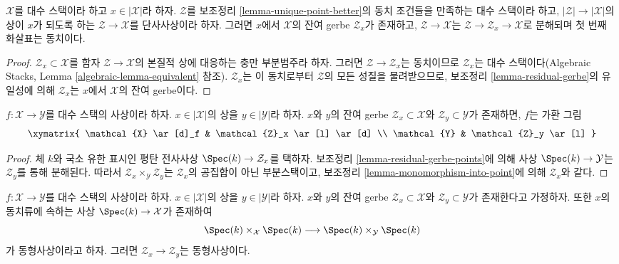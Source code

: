 \begin{lemma}
\label{lemma-residual-gerbe-unique}
$\mathcal{X}$를 대수 스택이라 하고 $x \in |\mathcal{X}|$라 하자.
$\mathcal{Z}$를 보조정리 \ref{lemma-unique-point-better}의 동치 조건들을
만족하는 대수 스택이라 하고, $|\mathcal{Z}| \to |\mathcal{X}|$의 상이
$x$가 되도록 하는 $\mathcal{Z} \to \mathcal{X}$를 단사사상이라 하자.
그러면 $x$에서 $\mathcal{X}$의 잔여 gerbe $\mathcal{Z}_x$가 존재하고,
$\mathcal{Z} \to \mathcal{X}$는
$\mathcal{Z} \to \mathcal{Z}_x \to \mathcal{X}$로 분해되며
첫 번째 화살표는 동치이다.
\end{lemma}

\begin{proof}
$\mathcal{Z}_x \subset \mathcal{X}$를 함자
$\mathcal{Z} \to \mathcal{X}$의 본질적 상에 대응하는 충만 부분범주라 하자.
그러면 $\mathcal{Z} \to \mathcal{Z}_x$는 동치이므로
$\mathcal{Z}_x$는 대수 스택이다(Algebraic Stacks,
Lemma \ref{algebraic-lemma-equivalent} 참조).
$\mathcal{Z}_x$는 이 동치로부터 $\mathcal{Z}$의 모든 성질을 물려받으므로,
보조정리 \ref{lemma-residual-gerbe}의 유일성에 의해
$\mathcal{Z}_x$는 $x$에서 $\mathcal{X}$의 잔여 gerbe이다.
\end{proof}

\begin{lemma}
\label{lemma-residual-gerbe-functorial}
$f : \mathcal{X} \to \mathcal{Y}$를 대수 스택의 사상이라 하자.
$x \in |\mathcal{X}|$의 상을 $y \in |\mathcal{Y}|$라 하자.
$x$와 $y$의 잔여 gerbe $\mathcal{Z}_x \subset \mathcal{X}$와
$\mathcal{Z}_y \subset \mathcal{Y}$가 존재하면, $f$는 가환 그림
$$
\xymatrix{
\mathcal{X} \ar[d]_f & \mathcal{Z}_x \ar[l] \ar[d] \\
\mathcal{Y} & \mathcal{Z}_y \ar[l]
}
$$
\end{lemma}

\begin{proof}
체 $k$와 국소 유한 표시인 평탄 전사사상
$\Spec(k) \to \mathcal{Z}_x$를 택하자. 보조정리
\ref{lemma-residual-gerbe-points}에 의해 사상
$\Spec(k) \to \mathcal{Y}$는 $\mathcal{Z}_y$를 통해 분해된다.
따라서 $\mathcal{Z}_x \times_\mathcal{Y} \mathcal{Z}_y$는
$\mathcal{Z}_x$의 공집합이 아닌 부분스택이고, 보조정리
\ref{lemma-monomorphism-into-point}에 의해 $\mathcal{Z}_x$와 같다.
\end{proof}

\begin{lemma}
\label{lemma-residual-gerbe-isomorphic}
$f : \mathcal{X} \to \mathcal{Y}$를 대수 스택의 사상이라 하자.
$x \in |\mathcal{X}|$의 상을 $y \in |\mathcal{Y}|$라 하자.
$x$와 $y$의 잔여 gerbe $\mathcal{Z}_x \subset \mathcal{X}$와
$\mathcal{Z}_y \subset \mathcal{Y}$가 존재한다고 가정하자.
또한 $x$의 동치류에 속하는 사상 $\Spec(k) \to \mathcal{X}$가 존재하여
$$
\Spec(k) \times_\mathcal{X} \Spec(k)
\longrightarrow
\Spec(k) \times_\mathcal{Y} \Spec(k)
$$
가 동형사상이라고 하자. 그러면 $\mathcal{Z}_x \to \mathcal{Z}_y$는
동형사상이다.
\end{lemma}

